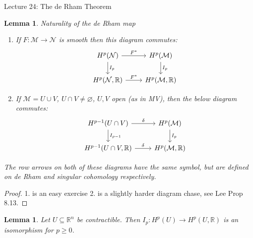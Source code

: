 \documentclass[10pt]{article}
\theoremstyle{plain}
\newtheorem{lemma}[thm]{Lemma}
\theoremstyle{definition}
\newcommand{\Real}{\mathbb{R}}
\newcommand{\man}{\mathcal{M}}
\newcommand{\nan}{\mathcal{N}}
\begin{document}
\begin{section}{Lecture 24: The de Rham Theorem}
\begin{lemma}{Naturality of the de Rham map}
    \begin{enumerate}
        \item If $F:\man \to \nan$ is smooth then this diagram commutes:
            $$%
            \begin{tikzcd}
             H^p(\mathcal{N}) \arrow[d, "I_p"] \arrow[r, "F^*"] & H^p(\mathcal{M}) \arrow[d, "I_p"] \\
              {H^p(\mathcal{N},\mathbb{R})} \arrow[r, "F^*"]     & {H^p(\mathcal{M},\mathbb{R})}    
             \end{tikzcd}$$
        \item If $\man = U \cup V$, $U\cap V \neq \varnothing$, $U,V$ open (as in MV), then the below diagram commutes:
        $$
            \begin{tikzcd}
            H^{p-1}(U\cap V) \arrow[r, "\delta"] \arrow[d, "I_{p-1}"] & H^p(\mathcal{M}) \arrow[d, "I_p"] \\
            {H^{p-1}(U\cap V,\mathbb{R})} \arrow[r, "\delta"]         & {H^{p}(\mathcal{M},\mathbb{R})}  
            \end{tikzcd}$$
    \end{enumerate}
    The row arrows on both of these diagrams have the same symbol, but are defined on de Rham and singular cohomology respectively.
\end{lemma}

\begin{proof}
    1. is an easy exercise 2. is a slightly harder diagram chase, see Lee Prop 8.13.
\end{proof}

\begin{lemma}
    Let $U\subseteq\Real^n$ be contractible. Then $I_p: H^p(U) \to H^p(U,\Real)$ is an isomorphism for $p \geq 0$.
\end{lemma}


\end{section}
\end{document}
